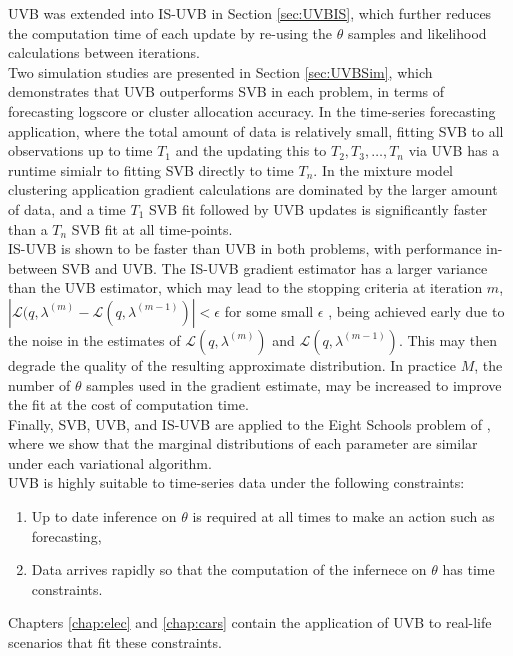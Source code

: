 \documentclass[
12pt, %
onehalfspacing, %
nohyperref, %
headsepline, %
chapterinoneline, %
]{MastersDoctoralThesis} %
\begin{document}
UVB was extended into IS-UVB in Section \ref{sec:UVBIS}, which further reduces the computation time of each update by re-using the $\theta$ samples and likelihood calculations between iterations.
\\

Two simulation studies are presented in Section \ref{sec:UVBSim}, which demonstrates that UVB outperforms SVB in each problem, in terms of forecasting logscore or cluster allocation accuracy. In the time-series forecasting application, where the total amount of data is relatively small, fitting SVB to all observations up to time $T_1$ and the updating this to $T_2, T_3, \ldots, T_n$ via UVB has a runtime simialr to fitting SVB directly to time $T_n$. In the mixture model clustering application gradient calculations are dominated by the larger amount of data, and a time $T_1$ SVB fit followed by UVB updates is significantly faster than a $T_n$ SVB fit at all time-points.
\\

IS-UVB is shown to be faster than UVB in both problems, with performance in-between SVB and UVB. The IS-UVB gradient estimator has a larger variance than the UVB estimator, which may lead to the stopping criteria at iteration $m$, $|\mathcal{L}(q, \lambda^{(m)} - \mathcal{L}(q, \lambda^{(m-1)})| < \epsilon$ for some small $\epsilon$ , being achieved early due to the noise in the estimates of $\mathcal{L}(q, \lambda^{(m)})$ and $\mathcal{L}(q, \lambda^{(m-1)})$. This may then degrade the quality of the resulting approximate distribution. In practice $M$, the number of $\theta$ samples used in the gradient estimate, may be increased to improve the fit at the cost of computation time.
\\

Finally, SVB, UVB, and IS-UVB are applied to the Eight Schools problem of \citet{Gelman2014}, where we show that the marginal distributions of each parameter are similar under each variational algorithm.
\\

UVB is highly suitable to time-series data under the following constraints:
\begin{enumerate}
\item Up to date inference on $\theta$ is required at all times to make an action such as forecasting,
\item Data arrives rapidly so that the computation of the infernece on $\theta$ has time constraints.
\end{enumerate}
Chapters \ref{chap:elec} and \ref{chap:cars} contain the application of UVB to real-life scenarios that fit these constraints.
\end{document}
